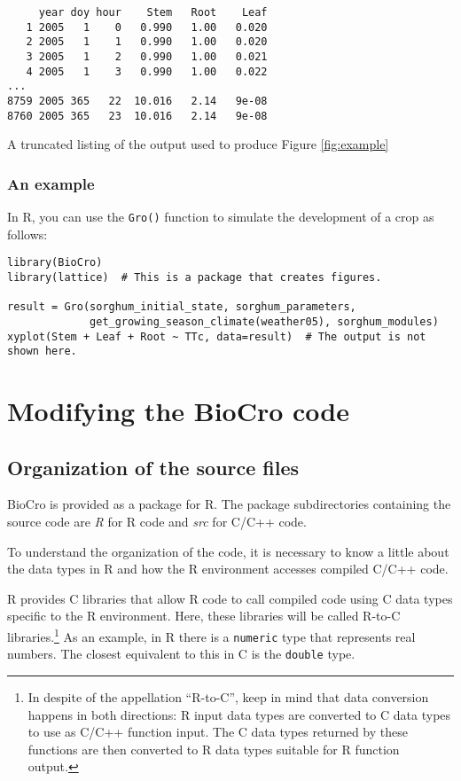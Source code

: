 \documentclass{article}
\newcommand{\code}[1]{\texttt{#1}}
\begin{document}
\begin{table}[!htbp]
\begin{center}
\begin{lstlisting}
     year doy hour    Stem   Root    Leaf
   1 2005   1    0   0.990   1.00   0.020
   2 2005   1    1   0.990   1.00   0.020
   3 2005   1    2   0.990   1.00   0.021
   4 2005   1    3   0.990   1.00   0.022
...
8759 2005 365   22  10.016   2.14   9e-08
8760 2005 365   23  10.016   2.14   9e-08
\end{lstlisting}
\caption{\label{tab:example_output} A truncated listing of the output used to produce Figure \ref{fig:example}}
\end{center}
\end{table}

\subsubsection{An example}
In R, you can use the \code{Gro()} function to simulate the
development of a crop as follows:

\begin{center}
\begin{lstlisting}
library(BioCro)
library(lattice)  # This is a package that creates figures.

result = Gro(sorghum_initial_state, sorghum_parameters,
             get_growing_season_climate(weather05), sorghum_modules)
xyplot(Stem + Leaf + Root ~ TTc, data=result)  # The output is not shown here.
\end{lstlisting}
\end{center}

\section{Modifying the BioCro code}
\subsection{Organization of the source files}
BioCro is provided as a package for R. The package subdirectories
containing the source code are \emph{R} for R code and \emph{src} for
C/C++ code.

To understand the organization of the code, it is necessary to know a
little about the data types in R and how the R environment accesses
compiled C/C++ code.

R provides C libraries that allow R code to call compiled code using C
data types specific to the R environment. Here, these libraries will
be called R-to-C libraries.\footnote{In despite of the appellation
  ``R-to-C'', keep in mind that data conversion happens in both
  directions: R input data types are converted to C data types to use
  as C/C++ function input.  The C data types returned by these
  functions are then converted to R data types suitable for R function
  output.} As an example, in R there is a \code{numeric} type that
represents real numbers.  The closest equivalent to this in C is the
\code{double} type.
\end{document}
